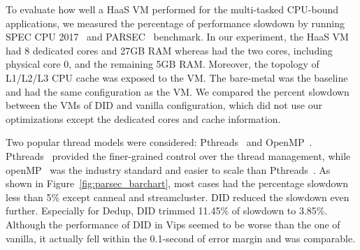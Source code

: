 



To evaluate how well a HaaS VM performed for the multi-tasked
CPU-bound applications, we measured the percentage of
performance slowdown by running SPEC CPU
2017~\cite{bucek:2018} and PARSEC~\cite{bienia:2008}
benchmark. In our experiment, the HaaS VM had 8 dedicated
cores and 27GB RAM whereas \na had the two cores, including
physical core 0, and the remaining 5GB RAM. Moreover, the
topology of L1/L2/L3 CPU cache was exposed to the VM. The
bare-metal was the baseline and had the same configuration as
the VM. We compared the percent slowdown between the VMs of
DID and vanilla configuration, which did not use our
optimizations except the dedicated cores and cache
information.

Two popular thread models were considered:
Pthreads~\cite{lewis:1998} and OpenMP~\cite{dagum:1998}.
Pthreads~\cite{lewis:1998} provided the finer-grained control
over the thread management, while openMP~\cite{dagum:1998} was
the industry standard and easier to scale than
Pthreads~\cite{lewis:1998}. As shown in
Figure~\ref{fig:parsec_barchart}, most cases had the
percentage slowdown less than 5\% except canneal and
streamcluster. DID reduced the slowdown even further.
Especially for Dedup, DID trimmed 11.45\% of slowdown to
3.85\%. Although the performance of DID in Vips seemed to be
worse than the one of vanilla, it actually fell within the
0.1-second of error margin and was comparable.

